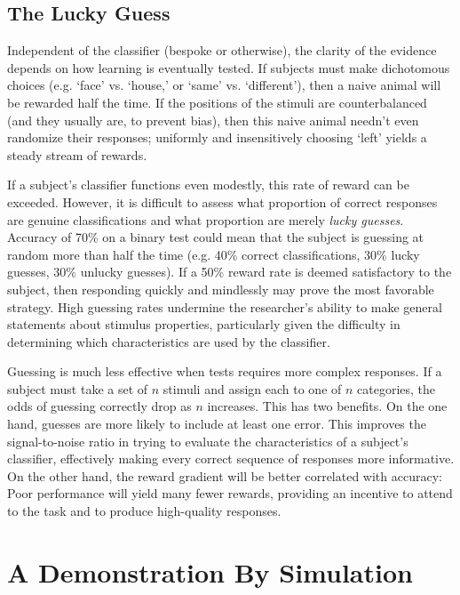 \documentclass[fleqn,10pt]{wlpeerj_noabs}
\begin{document}
\subsection*{The Lucky Guess}

Independent of the classifier (bespoke or otherwise), the clarity of the evidence depends on how learning is eventually tested. If subjects must make dichotomous choices (e.g. `face' vs. `house,' or `same' vs. `different'), then a naive animal will be rewarded half the time. If the positions of the stimuli are counterbalanced (and they usually are, to prevent bias), then this naive animal needn't even randomize their responses; uniformly and insensitively choosing `left' yields a steady stream of rewards.

If a subject's classifier functions even modestly, this rate of reward can be exceeded. However, it is difficult to assess what proportion of correct responses are genuine classifications and what proportion are merely \textsl{lucky guesses}. Accuracy of 70\% on a binary test could mean that the subject is guessing at random more than half the time (e.g. 40\% correct classifications, 30\% lucky guesses, 30\% unlucky guesses). If a 50\% reward rate is deemed satisfactory to the subject, then responding quickly and mindlessly may prove the most favorable strategy. High guessing rates undermine the researcher's ability to make general statements about stimulus properties, particularly given the difficulty in determining which characteristics are used by the classifier.

Guessing is much less effective when tests requires more complex responses. If a subject must take a set of $n$ stimuli and assign each to one of $n$ categories, the odds of guessing correctly drop as $n$ increases. This has two benefits. On the one hand, guesses are more likely to include at least one error. This improves the signal-to-noise ratio in trying to evaluate the characteristics of a subject's classifier, effectively making every correct sequence of responses more informative. On the other hand, the reward gradient will be better correlated with accuracy: Poor performance will yield many fewer rewards, providing an incentive to attend to the task and to produce high-quality responses.

\section*{A Demonstration By Simulation}
\end{document}
